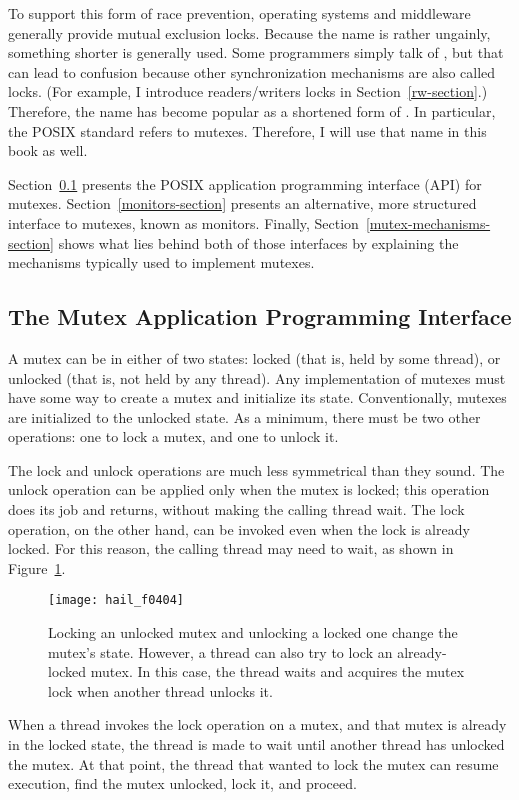 To
support this form of race prevention, operating systems and middleware generally
provide mutual exclusion locks.  Because the name 
is rather ungainly, something shorter is generally used.  Some
programmers simply talk of , but that can lead to confusion
because other synchronization mechanisms are also called locks. (For
example, I introduce readers/writers locks in Section~\ref{rw-section}.)  Therefore, the
name  has become popular as a shortened form of .  In particular, the POSIX standard refers to
mutexes.  Therefore, I will use that name in this book as well.

Section~\ref{mutex-api-section} presents the POSIX application
programming interface (API) for
mutexes. Section~\ref{monitors-section} presents an alternative, more
structured interface to mutexes, known as monitors.  Finally,
Section~\ref{mutex-mechanisms-section} shows what lies behind both
of those interfaces by explaining the mechanisms typically used to
implement mutexes.

\subsection{The Mutex Application Programming Interface}\label{mutex-api-section}

A mutex can be in either of two states: locked (that is, held by some
thread), or unlocked (that is, not held by any thread).  Any
implementation of mutexes must have some way to create a mutex and
initialize its state.  Conventionally, mutexes are initialized to the
unlocked state.  As a minimum, there must be two other operations: one
to lock a mutex, and one to unlock it.

The lock and unlock operations are much less symmetrical than they
sound.  The unlock operation can be applied only when the mutex is
locked; this operation does its job
and returns, without making the calling thread wait.  The lock
operation, on the other hand, can be invoked even when the lock is
already locked.  For this reason, the calling thread may need to wait, as shown in
Figure~\ref{scan-4-3}.
\begin{figure}
\centerline{\texttt{[image: hail\_f0404]}}
\caption{Locking an unlocked mutex and unlocking a locked one change
  the mutex's state.  However, a thread can also try to lock an
  already-locked mutex.  In this case, the thread waits and acquires
  the mutex lock when another thread unlocks it.}
\label{scan-4-3}
\end{figure}
When a thread invokes the lock operation on a mutex, and that mutex is
already in the locked state, the thread is made to wait until another
thread has unlocked the mutex.  At that point, the thread that wanted
to lock the mutex can resume execution, find the mutex unlocked, lock
it, and proceed.

